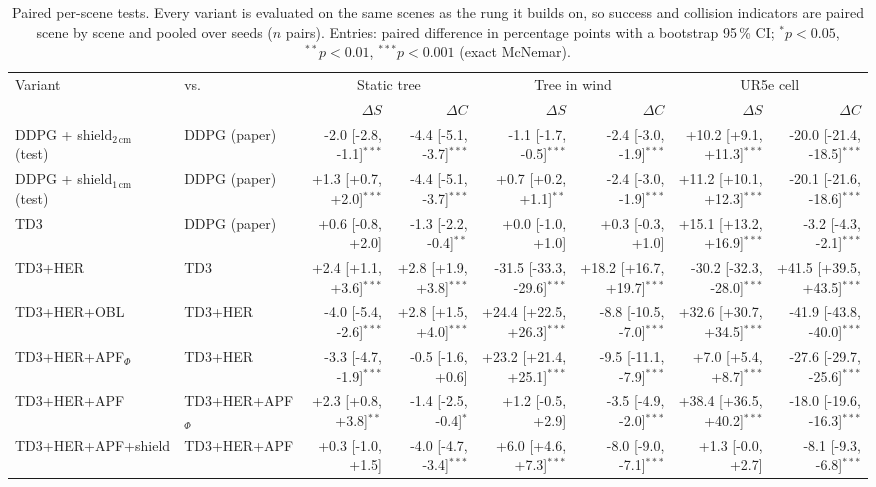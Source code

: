 \begin{table}[t]
\centering
\caption{Paired per-scene tests. Every variant is evaluated on the same scenes as the rung it builds on, so success and collision indicators are paired scene by scene and pooled over seeds ($n$ pairs). Entries: paired difference in percentage points with a bootstrap 95\,\% CI; $^{*}p<0.05$, $^{**}p<0.01$, $^{***}p<0.001$ (exact McNemar).}
\label{tab:paired}
\scriptsize
\setlength{\tabcolsep}{3pt}
\begin{tabular}{llrrrrrr}
\toprule
Variant & vs. & \multicolumn{2}{c}{Static tree} & \multicolumn{2}{c}{Tree in wind} & \multicolumn{2}{c}{UR5e cell} \\
 & & $\Delta S$ & $\Delta C$ & $\Delta S$ & $\Delta C$ & $\Delta S$ & $\Delta C$ \\
\midrule
DDPG + shield$_{2\,\mathrm{cm}}$ (test) & DDPG (paper) & -2.0 [-2.8, -1.1]$^{***}$ & -4.4 [-5.1, -3.7]$^{***}$ & -1.1 [-1.7, -0.5]$^{***}$ & -2.4 [-3.0, -1.9]$^{***}$ & +10.2 [+9.1, +11.3]$^{***}$ & -20.0 [-21.4, -18.5]$^{***}$ \\
DDPG + shield$_{1\,\mathrm{cm}}$ (test) & DDPG (paper) & +1.3 [+0.7, +2.0]$^{***}$ & -4.4 [-5.1, -3.7]$^{***}$ & +0.7 [+0.2, +1.1]$^{**}$ & -2.4 [-3.0, -1.9]$^{***}$ & +11.2 [+10.1, +12.3]$^{***}$ & -20.1 [-21.6, -18.6]$^{***}$ \\
TD3 & DDPG (paper) & +0.6 [-0.8, +2.0] & -1.3 [-2.2, -0.4]$^{**}$ & +0.0 [-1.0, +1.0] & +0.3 [-0.3, +1.0] & +15.1 [+13.2, +16.9]$^{***}$ & -3.2 [-4.3, -2.1]$^{***}$ \\
TD3+HER & TD3 & +2.4 [+1.1, +3.6]$^{***}$ & +2.8 [+1.9, +3.8]$^{***}$ & -31.5 [-33.3, -29.6]$^{***}$ & +18.2 [+16.7, +19.7]$^{***}$ & -30.2 [-32.3, -28.0]$^{***}$ & +41.5 [+39.5, +43.5]$^{***}$ \\
TD3+HER+OBL & TD3+HER & -4.0 [-5.4, -2.6]$^{***}$ & +2.8 [+1.5, +4.0]$^{***}$ & +24.4 [+22.5, +26.3]$^{***}$ & -8.8 [-10.5, -7.0]$^{***}$ & +32.6 [+30.7, +34.5]$^{***}$ & -41.9 [-43.8, -40.0]$^{***}$ \\
TD3+HER+APF$_\Phi$ & TD3+HER & -3.3 [-4.7, -1.9]$^{***}$ & -0.5 [-1.6, +0.6] & +23.2 [+21.4, +25.1]$^{***}$ & -9.5 [-11.1, -7.9]$^{***}$ & +7.0 [+5.4, +8.7]$^{***}$ & -27.6 [-29.7, -25.6]$^{***}$ \\
TD3+HER+APF & TD3+HER+APF$_\Phi$ & +2.3 [+0.8, +3.8]$^{**}$ & -1.4 [-2.5, -0.4]$^{*}$ & +1.2 [-0.5, +2.9] & -3.5 [-4.9, -2.0]$^{***}$ & +38.4 [+36.5, +40.2]$^{***}$ & -18.0 [-19.6, -16.3]$^{***}$ \\
TD3+HER+APF+shield & TD3+HER+APF & +0.3 [-1.0, +1.5] & -4.0 [-4.7, -3.4]$^{***}$ & +6.0 [+4.6, +7.3]$^{***}$ & -8.0 [-9.0, -7.1]$^{***}$ & +1.3 [-0.0, +2.7] & -8.1 [-9.3, -6.8]$^{***}$ \\

\end{tabular}
\end{table}
